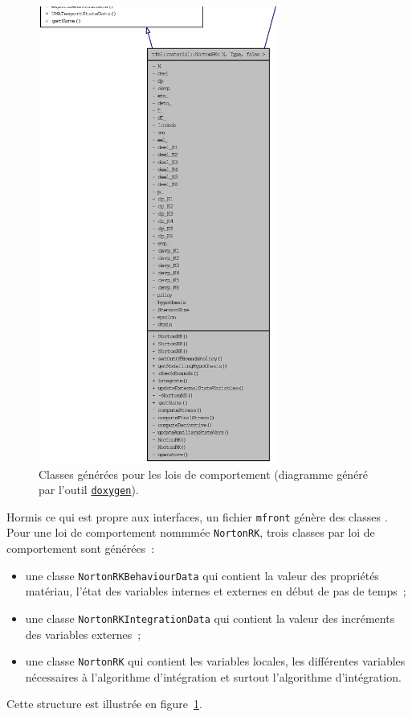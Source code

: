 \documentclass[rectoverso,pleiades,pstricks,leqno,anti]{texmf/note_technique_2010}
\newcommand{\mfront}{\texttt{mfront}}
\newcommand{\doxygen}{\href{http://www.stack.nl/~dimitri/doxygen/}{\texttt{doxygen}}}
\def\ifmonospace{\ifdim\fontdimen3\font=0pt }
\def\cpp{%
\ifmonospace%
    C++%
\else%
    C\kern-.1667em\raise.30ex\hbox{\smaller{++}}%
\fi%
\spacefactor1000 }
\begin{document}
\begin{figure}[htbp]
  \centering
  \includegraphics[height=15cm]{Images/NortonRK.eps}
  \caption{Classes générées pour les lois de comportement (diagramme
    généré par l'outil \doxygen{}).}
  \label{fig:nortonrk:inheritance}
\end{figure}

Hormis ce qui est propre aux interfaces, un fichier \mfront{} génère des
classes \cpp{}. Pour une loi de comportement nommmée \texttt{NortonRK},
trois classes par loi de comportement sont générées~:
\begin{itemize}
  \item une classe \texttt{NortonRKBehaviourData} qui contient la valeur
  des propriétés matériau, l'état des variables internes et externes en
  début de pas de temps~;
  \item une classe \texttt{NortonRKIntegrationData} qui contient la
  valeur des incréments des variables externes~;
  \item une classe \texttt{NortonRK} qui contient les variables locales,
  les différentes variables nécessaires à l'algorithme d'intégration et
  surtout l'algorithme d'intégration.
\end{itemize}
Cette structure est illustrée en figure~\ref{fig:nortonrk:inheritance}.
\end{document}
